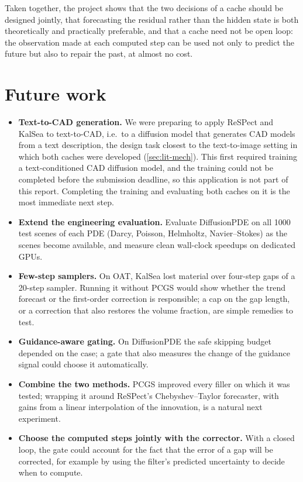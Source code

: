 Taken together, the project shows that the two decisions of a cache should be designed jointly, that forecasting the residual rather than the hidden state is both theoretically and practically preferable, and that a cache need not be open loop: the observation made at each computed step can be used not only to predict the future but also to repair the past, at almost no cost.

\section{Future work}

\begin{itemize}
  \item \textbf{Text-to-CAD generation.} We were preparing to apply ReSPect and KalSea to text-to-CAD, i.e.\ to a diffusion model that generates CAD models from a text description, the design task closest to the text-to-image setting in which both caches were developed (\cref{sec:lit-mech}). This first required training a text-conditioned CAD diffusion model, and the training could not be completed before the submission deadline, so this application is not part of this report. Completing the training and evaluating both caches on it is the most immediate next step.
  \item \textbf{Extend the engineering evaluation.} Evaluate DiffusionPDE on all 1000 test scenes of each PDE (Darcy, Poisson, Helmholtz, Navier--Stokes) as the scenes become available, and measure clean wall-clock speedups on dedicated GPUs.
  \item \textbf{Few-step samplers.} On OAT, KalSea lost material over four-step gaps of a 20-step sampler. Running it without PCGS would show whether the trend forecast or the first-order correction is responsible; a cap on the gap length, or a correction that also restores the volume fraction, are simple remedies to test.
  \item \textbf{Guidance-aware gating.} On DiffusionPDE the safe skipping budget depended on the case; a gate that also measures the change of the guidance signal could choose it automatically.
  \item \textbf{Combine the two methods.} PCGS improved every filler on which it was tested; wrapping it around ReSPect's Chebyshev--Taylor forecaster, with gains from a linear interpolation of the innovation, is a natural next experiment.
  \item \textbf{Choose the computed steps jointly with the corrector.} With a closed loop, the gate could account for the fact that the error of a gap will be corrected, for example by using the filter's predicted uncertainty to decide when to compute.

\end{itemize}
